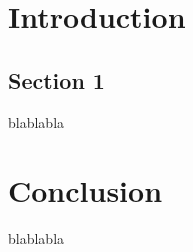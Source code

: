 \documentclass[french]{spimufchdr}
\begin{document}
 
\tableofcontents
 
 
\chapter{Introduction}
 
\section{Section 1}
 
blablabla
 
\chapter{Conclusion}
 
blablabla
 
 
 
%
\listoffigures
\listoftables
 
\appendix
 
\end{document}

